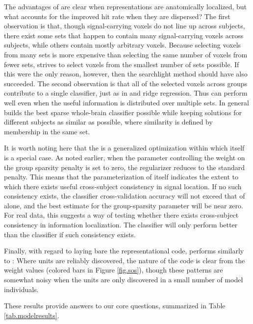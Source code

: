 The advantages of {\soslasso} are clear when representations are anatomically localized, but what accounts for the improved hit rate when they are dispersed? The first observation is that, though signal-carrying voxels do not line up across subjects, there exist some sets that happen to contain many signal-carrying voxels across subjects, while others contain mostly arbitrary voxels. Because selecting voxels from many sets is more expensive than selecting the same number of voxels from fewer sets, {\soslasso} strives to select voxels from the smallest number of sets possible. If this were the only reason, however, then the searchlight method should have also succeeded. The second observation is that all of the selected voxels across groups contribute to a single classifier, just as in {\lasso} and ridge regression. Thus {\soslasso} can perform well even when the useful information is distributed over multiple sets. In general {\soslasso} builds the best sparse whole-brain classifier possible while keeping solutions for different subjects as similar as possible, where similarity is defined by membership in the same set.

It is worth noting here that the {\soslasso} is a generalized optimization within which {\lasso} itself is a special case. As noted earlier, when the parameter controlling the weight on the group sparsity penalty is set to zero, the regularizer reduces to the standard {\lasso} penalty. This means that the parameterization of {\soslasso} itself indicates the extent to which there exists useful cross-subject consistency in signal location. If no such consistency exists, the classifier cross-validation accuracy will not exceed that of {\lasso} alone, and the best estimate for the group-sparsity parameter will be near zero. For real data, this suggests a way of testing whether there exists cross-subject consistency in information localization. The {\soslasso} classifier will only perform better than the {\lasso} classifier if such consistency exists.

Finally, with regard to laying bare the representational code, {\soslasso} performs similarly to {\lasso}: Where units are reliably discovered, the nature of the code is clear from the weight values (colored bars in Figure \ref{fig.sos}), though these patterns are somewhat noisy when the units are only discovered in a small number of model individuals.

These results provide answers to our core questions, summarized in Table \ref{tab.modelresults}.


